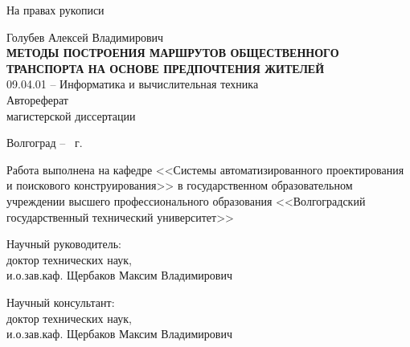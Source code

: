\documentclass[a5paper, 10pt]{article}
\begin{document}
    \begin{titlepage}
        \hspace{15em}На правах рукописи\\
        \begin{center}
            \vspace{8em}Голубев Алексей Владимирович\\
            \large\vspace{2em}\textbf{\MakeUppercase{Методы построения маршрутов общественного 
                транспорта на основе предпочтения жителей}}\normalsize\\
            \vspace{8em}09.04.01 -- Информатика и вычислительная техника\\
            \vspace{8em}Автореферат\\магистерской диссертации
        \end{center}
        \vfill
        \begin{center}
            Волгоград -- \the\year\ г.
        \end{center}
        \newpage
        \thispagestyle{empty}
        Работа выполнена на кафедре <<Системы автоматизированного проектирования и поискового 
        конструирования>> в государственном образовательном учреждении высшего профессионального 
        образования <<Волгоградский государственный технический университет>>\\
        \vspace{3em}\begin{flushleft}
            Научный руководитель:\\
            \hspace{2cm}доктор технических наук,\\
            \hspace{2cm}и.о.зав.каф. Щербаков Максим Владимирович\\
        \end{flushleft}
        \vspace{1em}\begin{flushleft}
            Научный консультант:\\
            \hspace{2cm}доктор технических наук,\\
            \hspace{2cm}и.о.зав.каф. Щербаков Максим Владимирович\\
        \end{flushleft}
    \end{titlepage}
    \newpage
    \onehalfspacing
    \setcounter{page}{3}
    
\end{document}
